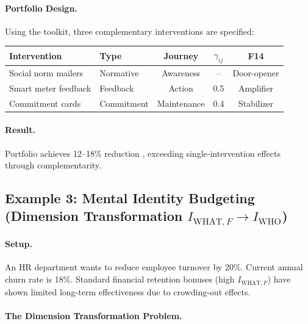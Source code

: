 \paragraph{Portfolio Design.} Using the toolkit, three complementary interventions are specified:

\begin{table}[htbp]
\centering
\small
\begin{tabular}{@{}llccc@{}}
\toprule
\textbf{Intervention} & \textbf{Type} & \textbf{Journey} & \textbf{$\gamma_{ij}$} & \textbf{F14} \\
\midrule
Social norm mailers & Normative & Awareness & -- & Door-opener \\
Smart meter feedback & Feedback & Action & 0.5 & Amplifier \\
Commitment cards & Commitment & Maintenance & 0.4 & Stabilizer \\
\bottomrule
\end{tabular}
\end{table}

\paragraph{Result.} Portfolio achieves 12--18\% reduction \citep{allcott2011}, exceeding single-intervention effects through complementarity.


\subsection{Example 3: Mental Identity Budgeting (Dimension Transformation $I_{\text{WHAT},F} \rightarrow I_{\text{WHO}}$)}
\label{sec:hhh-example-identity-budgets}

\paragraph{Setup.} An HR department wants to reduce employee turnover by 20\%. Current annual churn rate is 18\%. Standard financial retention bonuses (high $I_{\text{WHAT},F}$) have shown limited long-term effectiveness due to crowding-out effects.

\paragraph{The Dimension Transformation Problem.}

